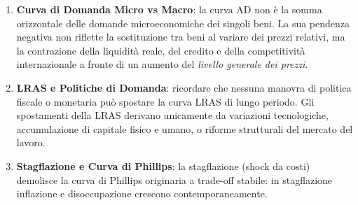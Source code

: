 \begin{esame}
\begin{enumerate}
    \item \textbf{Curva di Domanda Micro vs Macro}: la curva AD non è la somma orizzontale delle domande microeconomiche dei singoli beni. La sua pendenza negativa non riflette la sostituzione tra beni al variare dei prezzi relativi, ma la contrazione della liquidità reale, del credito e della competitività internazionale a fronte di un aumento del \textit{livello generale dei prezzi}.
    \item \textbf{LRAS e Politiche di Domanda}: ricordare che nessuna manovra di politica fiscale o monetaria può spostare la curva LRAS di lungo periodo. Gli spostamenti della LRAS derivano unicamente da variazioni tecnologiche, accumulazione di capitale fisico e umano, o riforme strutturali del mercato del lavoro.
    \item \textbf{Stagflazione e Curva di Phillips}: la stagflazione (shock da costi) demolisce la curva di Phillips originaria a trade-off stabile: in stagflazione inflazione e disoccupazione crescono contemporaneamente.
\end{enumerate}
\end{esame}
